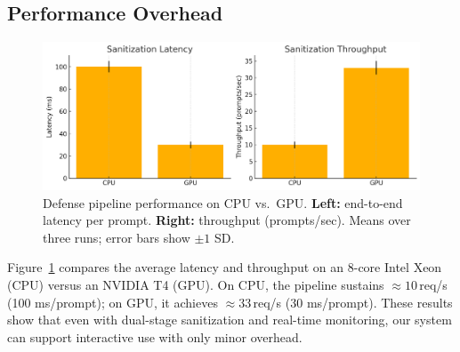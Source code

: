 \documentclass[conference]{IEEEtran}
\begin{document}
\subsection{Performance Overhead}
\begin{figure}[ht]
  \centering
  \includegraphics[width=\linewidth]{latency_throughput.png}
  \caption{Defense pipeline performance on CPU vs.\ GPU. \textbf{Left:} end-to-end latency per prompt. \textbf{Right:} throughput (prompts/sec). Means over three runs; error bars show \(\pm1\) SD.}
  \label{fig:perf}
\end{figure}

Figure~\ref{fig:perf} compares the average latency and throughput on an 8-core Intel Xeon (CPU) versus an NVIDIA T4 (GPU). On CPU, the pipeline sustains \(\approx10\)\,req/s (100 ms/prompt); on GPU, it achieves \(\approx33\)\,req/s (30 ms/prompt). These results show that even with dual-stage sanitization and real-time monitoring, our system can support interactive use with only minor overhead.
\end{document}
